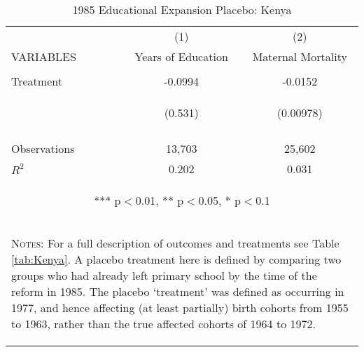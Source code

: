 \begin{subtables}
\begin{table}[htpb!]					
\begin{center}					
\caption{1985 Educational Expansion Placebo: Kenya}					
\label{MMRtab:KenyaPlacebo}					
\begin{tabular}{p{3cm}cc}	\toprule				
	&	(1)	&	(2)	\\
VARIABLES	&	Years of Education	&	Maternal Mortality	\\ \midrule
\vspace{4pt}	&	\begin{footnotesize}\end{footnotesize}	&	\begin{footnotesize}\end{footnotesize}	 \\
Treatment	&	-0.0994	&	-0.0152	\\
	& \begin{footnotesize}	(0.531)	\end{footnotesize} & \begin{footnotesize}	(0.00978)	\end{footnotesize} \\
\vspace{4pt}	&	\begin{footnotesize}\end{footnotesize}	&	\begin{footnotesize}\end{footnotesize}	 \\
Observations	&	13,703	&	25,602	\\
$R^2$	&	0.202	&	0.031	\\ \midrule
\multicolumn{3}{c}{\begin{footnotesize} *** p$<$0.01, ** p$<$0.05, * p$<$0.1\end{footnotesize}} \\					
\multicolumn{3}{p{9.6cm}}{\begin{footnotesize}\textsc{Notes:} For a full description of outcomes and treatments see Table \ref{tab:Kenya}. A placebo treatment here is defined by comparing two groups who had already left primary school by the time of the reform in 1985.  The placebo `treatment' was defined as occurring in 1977, and hence affecting (at least partially) birth cohorts from 1955 to 1963, rather than the true affected cohorts of 1964 to 1972. \end{footnotesize}} \\					
\bottomrule					
\end{tabular}					
\end{center}					
\end{table}					
\end{subtables}
